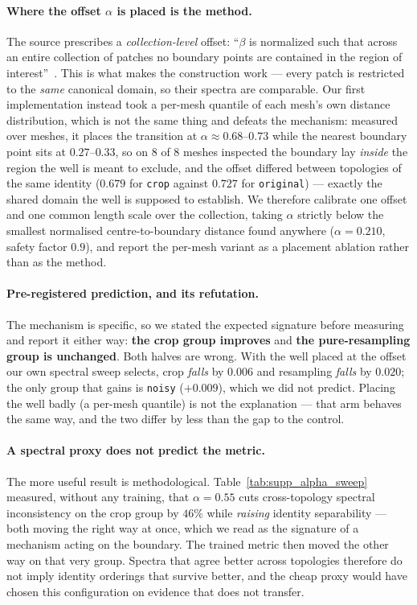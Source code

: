 \documentclass{article}
\begin{document}
\paragraph{Where the offset $\alpha$ is placed is the method.}
The source prescribes a \emph{collection-level} offset: ``$\beta$ is normalized such that
across an entire collection of patches no boundary points are contained in the region of
interest''~\cite{liu2017dirac}. This is what makes the construction work --- every patch is
restricted to the \emph{same} canonical domain, so their spectra are comparable. Our first
implementation instead took a per-mesh quantile of each mesh's own distance distribution,
which is not the same thing and defeats the mechanism: measured over meshes, it places the
transition at $\alpha \approx 0.68$--$0.73$ while the nearest boundary point sits at
$0.27$--$0.33$, so on $8$ of $8$ meshes inspected the boundary lay \emph{inside} the region
the well is meant to exclude, and the offset differed between topologies of the same identity
($0.679$ for \texttt{crop} against $0.727$ for \texttt{original}) --- exactly the shared
domain the well is supposed to establish. We therefore calibrate one offset and one common
length scale over the collection, taking $\alpha$ strictly below the smallest normalised
centre-to-boundary distance found anywhere ($\alpha = 0.210$, safety factor $0.9$), and report
the per-mesh variant as a placement ablation rather than as the method.

\paragraph{Pre-registered prediction, and its refutation.}
The mechanism is specific, so we stated the expected signature before measuring and report it
either way: \textbf{the crop group improves} and \textbf{the pure-resampling group is
unchanged}. Both halves are wrong. With the well placed at the offset our own spectral sweep
selects, crop \emph{falls} by $0.006$ and resampling \emph{falls} by $0.020$; the only group
that gains is \texttt{noisy} ($+0.009$), which we did not predict. Placing the well badly (a
per-mesh quantile) is not the explanation --- that arm behaves the same way, and the two
differ by less than the gap to the control.

\paragraph{A spectral proxy does not predict the metric.}
The more useful result is methodological. Table~\ref{tab:supp_alpha_sweep} measured, without
any training, that $\alpha = 0.55$ cuts cross-topology spectral inconsistency on the crop group
by $46\%$ while \emph{raising} identity separability --- both moving the right way at once, which
we read as the signature of a mechanism acting on the boundary. The trained metric then moved
the other way on that very group. Spectra that agree better across topologies therefore do not
imply identity orderings that survive better, and the cheap proxy would have chosen this
configuration on evidence that does not transfer.
\end{document}
